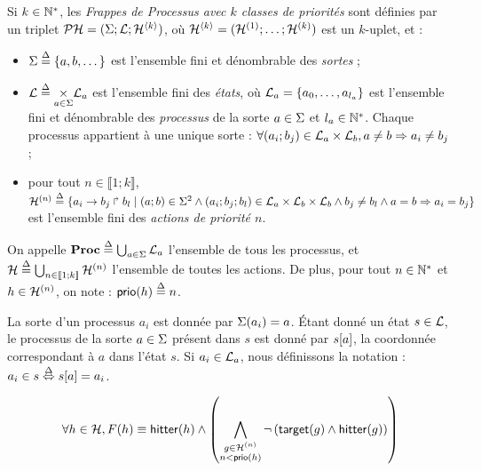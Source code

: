 \begin{definition}
  Si $k \in \mathbb{N}^*$, les \emph{Frappes de Processus avec $k$ classes de priorités} sont définies
  par un triplet $\mathcal{PH} = (\Sigma; \mathcal{L}; \mathcal{H}^{\langle k \rangle})$,
  où $\mathcal{H}^{\langle k \rangle} = (\mathcal{H}^{(1)}; \dots; \mathcal{H}^{(k)})$ est un $k$-uplet, et :
  \begin{itemize}
    \item $\Sigma \stackrel{\Delta}= \{a, b, \dots\}$ est l'ensemble fini et dénombrable des \emph{sortes} ;
    \item $\mathcal{L} \stackrel{\Delta}= \underset{a \in \Sigma}{\times} \mathcal{L}_a$ est l'ensemble fini des \emph{états},
      où $\mathcal{L}_a = \{a_0, \ldots, a_{l_a}\}$ est l'ensemble fini et dénombrable
      des \emph{processus} de la sorte $a \in \Sigma$ et $l_a \in \mathbb{N}^*$.
      Chaque processus appartient à une unique sorte :
      $\forall (a_i; b_j) \in \mathcal{L}_a \times \mathcal{L}_b, a \neq b \Rightarrow a_i \neq b_j$ ;
    \item pour tout $n \in \llbracket 1; k \rrbracket$,
      $\mathcal{H}^{(n)} \stackrel{\Delta}= \{a_i\rightarrow b_j\Rsh b_l \mid (a; b) \in \Sigma^2 \wedge
      (a_i; b_j; b_l) \in \mathcal{L}_a \times \mathcal{L}_b \times \mathcal{L}_b \wedge
      b_j \neq b_l \wedge a = b \Rightarrow a_i = b_j \}$ est l'ensemble fini
      des \emph{actions de priorité $n$}.
  \end{itemize}
  On appelle $\mathbf{Proc} \stackrel{\Delta}= \bigcup_{a \in \Sigma} \mathcal{L}_a$ l'ensemble de tous les processus,
  et $\mathcal{H} \stackrel{\Delta}= \bigcup_{n \in \llbracket 1; k \rrbracket} \mathcal{H}^{(n)}$ l'ensemble de toutes les actions.
  De plus, pour tout $n \in \mathbb{N}^*$ et $h \in \mathcal{H}^{(n)}$, on note : $\mathsf{prio}(h) \stackrel{\Delta}= n$.
\end{definition}
%
\noindent
{}
La sorte d'un processus $a_i$ est donnée par $\Sigma(a_i) = a$.
Étant donné un état $s \in \mathcal{L}$, le processus de la sorte $a \in \Sigma$ présent dans $s$ est donné
par ${s[a]}$, \cad la coordonnée correspondant à $a$ dans l'état $s$.
Si $a_i \in \mathcal{L}_a$, nous définissons la notation : $a_i \in s \stackrel{\Delta}\Leftrightarrow {s[a]} = a_i$.

\begin{definition}
    \[\forall h \in \mathcal{H}, F(h) \equiv \mathsf{hitter}(h) \wedge
    \left( \bigwedge_{\substack{g \in \mathcal{H}^{(n)}\\n < \mathsf{prio}(h)}}
    \neg \left( \mathsf{target}(g) \wedge \mathsf{hitter}(g)\right) \right)\]
\end{definition}


